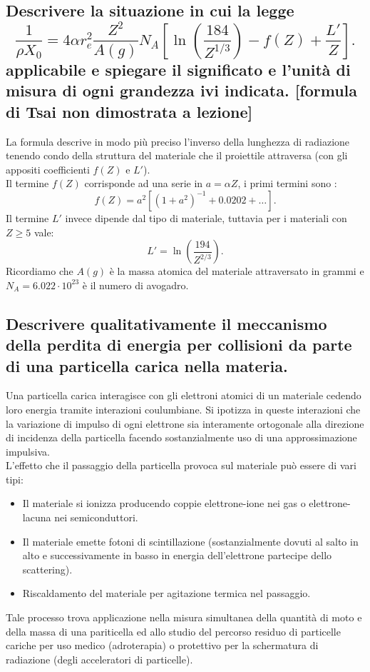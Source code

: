 \subsection[]{Descrivere la situazione in cui la legge
	\[
		\frac{1}{\rho X_0} = 4 \alpha r^2_e\frac{Z^2}{A\left(g\right)}N_A\left[\ln\left(\frac{184}{Z^{1/3}}\right)-f\left(Z\right)+\frac{L'}{Z}\right] 
	.\] 
applicabile e spiegare il significato e l'unità di misura di ogni grandezza ivi indicata. [formula di Tsai non dimostrata a lezione]
}\label{sec:4.a.20}
La formula descrive in modo più preciso l'inverso della lunghezza di radiazione tenendo condo della struttura del materiale che il proiettile attraversa (con gli appositi coefficienti $f\left( Z\right) $ e $L'$).\\
Il termine $f\left( Z \right) $ corrisponde ad una serie in $a = \alpha Z$, i primi termini sono :
\[
	f\left( Z \right) = a^2\left[ \left( 1+a^2 \right)^{-1}+0.0202 + \ldots \right] 
.\] 
Il termine $L'$ invece dipende dal tipo di materiale, tuttavia per i materiali con $Z\ge 5$ vale:
\[
	L' = \ln\left( \frac{194}{Z^{2 /3}} \right) 
.\] 
Ricordiamo che $A\left( g \right) $ è la massa atomica del materiale attraversato in grammi e $N_A = 6.022 \cdot 10^{23} $ è il numero di avogadro.
\subsection[]{Descrivere qualitativamente il meccanismo della perdita di energia per collisioni da parte di una particella carica nella materia.
}\label{sec:4.a.21}
Una particella carica interagisce con gli elettroni atomici di un materiale cedendo loro energia tramite interazioni coulumbiane. Si ipotizza in queste interazioni che la variazione di impulso di ogni elettrone sia interamente ortogonale alla direzione di incidenza della particella facendo sostanzialmente uso di una approssimazione impulsiva. \\
L'effetto che il passaggio della particella provoca sul materiale può essere di vari tipi:
\begin{itemize}
	\item Il materiale si ionizza producendo coppie elettrone-ione nei gas o elettrone-lacuna nei semiconduttori.
	\item Il materiale emette fotoni di scintillazione (sostanzialmente dovuti al salto in alto e successivamente in basso in energia dell'elettrone partecipe dello scattering).
	\item Riscaldamento del materiale per agitazione termica nel passaggio.
\end{itemize}
Tale processo trova applicazione nella misura simultanea della quantità di moto e della massa di una pariticella ed allo studio del percorso residuo di particelle cariche per uso medico (adroterapia) o protettivo per la schermatura di radiazione (degli acceleratori di particelle).

